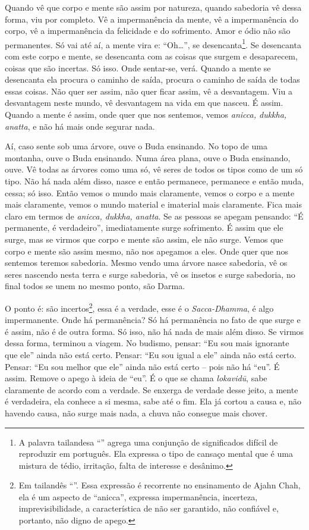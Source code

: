 Quando vê que corpo e mente são assim por natureza, quando sabedoria
vê dessa forma, viu por completo. Vê a impermanência da mente, vê a
impermanência do corpo, vê a impermanência da felicidade e do
sofrimento. Amor e ódio não são permanentes. Só vai até aí, a mente
vira e: “Oh…”, se desencanta\footnote{A palavra tailandesa
“” agrega uma conjunção de significados
difícil de reproduzir em português. Ela expressa o tipo de cansaço
mental que é uma mistura de tédio, irritação, falta de interesse e
desânimo.}. Se desencanta com este corpo e mente, se desencanta com as
coisas que surgem e desaparecem, coisas que são incertas. Só isso. Onde
sentar-se, verá. Quando a mente se desencanta ela procura o caminho de
saída, procura o caminho de saída de todas essas coisas. Não quer ser
assim, não quer ficar assim, vê a desvantagem. Viu a desvantagem neste
mundo, vê desvantagem na vida em que nasceu. É assim. Quando a mente é
assim, onde quer que nos sentemos, vemos \textit{anicca, dukkha,
anatta}, e não há mais onde segurar nada. 

Aí, caso sente sob uma árvore, ouve o Buda ensinando. No topo de uma
montanha, ouve o Buda ensinando. Numa área plana, ouve o Buda
ensinando, ouve. Vê todas as árvores como uma só, vê seres de todos os
tipos como de um só tipo. Não há nada além disso, nasce e então
permanece, permanece e então muda, cessa; só isso. Então vemos o mundo
mais claramente, vemos o corpo e a mente mais claramente, vemos o mundo
material e imaterial mais claramente. Fica mais claro em
termos de \textit{anicca, dukkha, anatta}. Se as pessoas se apegam
pensando: “É permanente, é verdadeiro”, imediatamente surge sofrimento.
É assim que ele surge, mas se virmos que corpo e mente são assim, ele
não surge. Vemos que corpo e mente são assim mesmo, não nos apegamos a
eles. Onde quer que nos sentemos teremos sabedoria. Mesmo vendo uma
árvore nasce sabedoria, vê os seres nascendo nesta terra e surge
sabedoria, vê os insetos e surge sabedoria, no final todos se unem no
mesmo ponto, são Darma. 

O ponto é: são incertos\footnote{Em tailandês
“”. Essa expressão é recorrente no
ensinamento de Ajahn Chah, ela é um aspecto de “anicca”, expressa
impermanência, incerteza, imprevisibilidade, a característica de não
ser garantido, não confiável e, portanto, não digno de apego.}, essa é
a verdade, esse é o \textit{Sacca-Dhamma}, é algo impermanente. Onde há
permanência? Só há permanência no fato de que surge e é assim, não é de
outra forma. Só isso, não há nada de mais além disso. Se virmos dessa
forma, terminou a viagem. No budismo, pensar: “Eu sou mais ignorante
que ele” ainda não está certo. Pensar: “Eu sou igual a ele” ainda não
está certo. Pensar: “Eu sou melhor que ele” ainda não está certo – pois
não há “eu”. É assim. Remove o apego à ideia de “eu”. É o que se chama
\textit{lokavidū}, sabe claramente de acordo com a verdade. Se
enxerga de verdade desse jeito, a mente é verdadeira, ela conhece a si
mesma, sabe até o fim. Ela já cortou a causa e, não havendo causa, não
surge mais nada, a chuva não consegue mais chover.

